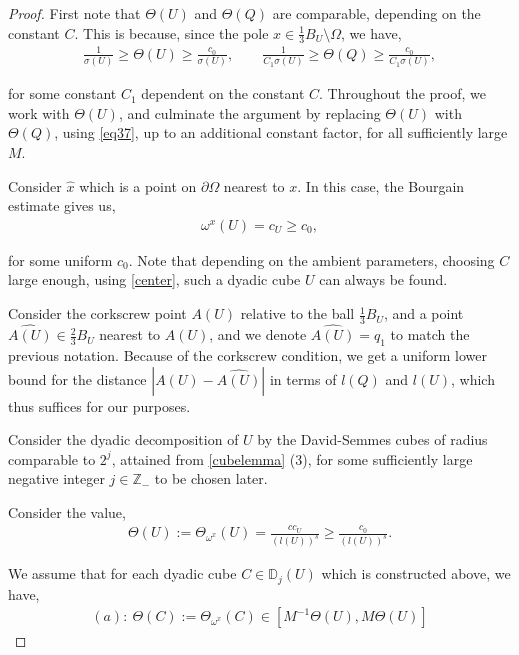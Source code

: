 \documentclass{article}
\newcounter{lem}
\theoremstyle{plain}
\theoremstyle{plain}
\newcommand{\D}{\mathbb{D}}
\newcommand{\Z}{\mathbb{Z}}
\theoremstyle{definition}
\theoremstyle{plain}
\begin{document}
    \begin{proof}  First note that $\Theta(U)$ and $\Theta(Q)$ are comparable, depending on the constant $C$. This is because, since the pole $x\in \frac{1}{3}B_U\setminus\Omega$, we have,
    \begin{align}\label{eq37}
      \frac{1}{\sigma(U)} \geq \Theta(U)\geq \frac{c_0}{\sigma(U)}, \qquad \frac{1}{C_1\sigma(U)} \geq \Theta(Q)\geq \frac{c_0}{C_1 \sigma(U)},
    \end{align}

    for some constant $C_1$ dependent on the constant $C$. Throughout the proof, we work with $\Theta(U)$, and culminate the argument by replacing $\Theta(U)$ with $\Theta(Q)$, using \cref{eq37}, up to an additional constant factor, for all sufficiently large $M$.

    
      Consider $\widehat{x}$ which is a point on $\partial\Omega$ nearest to $x$. In this case, the Bourgain estimate gives us, 
            \begin{align}\label{eq200}
          \omega^x(U )=c_{U}\geq c_0,
      \end{align}

for some uniform $c_0$. Note that depending on the ambient parameters, choosing $C$ large enough, using \cref{center}, such a dyadic cube $U$ can always be found.

Consider the corkscrew point $A(U)$ relative to the ball $\frac{1}{3}B_U$, and a point $\widehat{A(U)}\in \frac{2}{3}B_U$ nearest to $A(U)$, and we denote $\widehat{A(U)}=q_1$ to match the previous notation. Because of the corkscrew condition, we get a uniform lower bound for the distance $|A(U)-\widehat{A(U)}|$ in terms of $l(Q)$ and $l(U)$, which thus suffices for our purposes.

Consider  the dyadic decomposition of $U$ by the David-Semmes cubes of radius comparable to $2^j$, attained from \cref{cubelemma} (3), for some sufficiently large negative integer $j\in \Z_{-}$ to be chosen later.

Consider the value,
\begin{align}\label{localdensity}
    \Theta(U):=\Theta_{\omega^x}(U)=\frac{c c_{U} }{( l(U))^{s}}\geq \frac{c_0}{(l(U))^{s}}.
\end{align}

We assume that for each dyadic cube $C\in \D_j(U)$ which is constructed above, we have,
\begin{align}\label{a}
  (a): \  \Theta(C):=\Theta_{\omega^x}(C)\in [M^{-1}\Theta(U), M\Theta(U)]
\end{align}


\end{proof}
\end{document}
